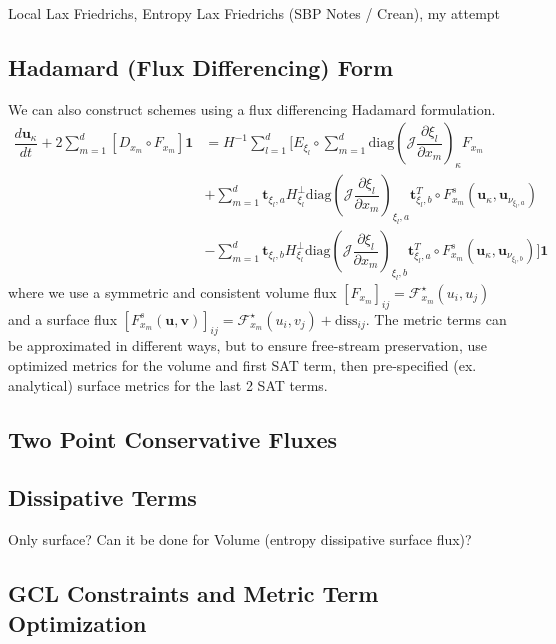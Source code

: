 \documentclass[12pt,a4paper]{article}
\newcommand{\pder}[2][]{\dfrac{\partial #1}{\partial #2}} %
\newcommand{\der}[2][]{\dfrac{d #1}{d #2}} %
\newcommand{\fn}[1]{\mathcal{#1}} %
\begin{document}
Local Lax Friedrichs, Entropy Lax Friedrichs (SBP Notes / Crean), my attempt

\subsection{Hadamard (Flux Differencing) Form}

We can also construct schemes using a flux differencing Hadamard formulation.
\begin{align*}
\der[\bm{u}_\kappa]{t} + 2 \sum_{m=1}^d \left[ D_{x_m} \circ F_{x_m} \right] \bm{1}  
&= H^{-1} \sum_{l=1}^d \Bigg[ E_{\xi_l} \circ \sum_{m=1}^d \text{diag} \left( \fn{J} \pder[\xi_l]{x_m} \right)_{\kappa} F_{x_m} \\
&  + \sum_{m=1}^d \bm{t}_{\xi_l, a} H^{\bot}_{\xi_l} \text{diag} \left( \fn{J} \pder[\xi_l]{x_m} \right)_{\xi_l,a} \bm{t}_{\xi_l, b}^T \circ  F^s_{x_m} (\bm{u}_\kappa, \bm{u}_{\nu_{\xi_l,a}}) \\
& - \sum_{m=1}^d \bm{t}_{\xi_l, b} H^{\bot}_{\xi_l}  \text{diag} \left( \fn{J} \pder[\xi_l]{x_m} \right)_{\xi_l,b} \bm{t}_{\xi_l, a}^T \circ F^s_{x_m} (\bm{u}_\kappa, \bm{u}_{\nu_{\xi_l,b}})
\Bigg] \bm{1}
\end{align*}
where we use a symmetric and consistent volume flux $ [F_{x_m}]_{ij} = \fn{F}^\star_{x_m} (u_i, u_j)$ and a surface flux $ [F^s_{x_m} (\bm{u}, \bm{v} )]_{ij} = \fn{F}^\star_{x_m} (u_i, v_j) + \text{diss}_{ij}$. The metric terms can be approximated in different ways, but to ensure free-stream preservation, use optimized metrics for the volume and first SAT term, then pre-specified (ex. analytical) surface metrics for the last 2 SAT terms.


\subsection{Two Point Conservative Fluxes}

\subsection{Dissipative Terms}

Only surface? Can it be done for Volume (entropy dissipative surface flux)?

\subsection{GCL Constraints and Metric Term Optimization}
\end{document}
